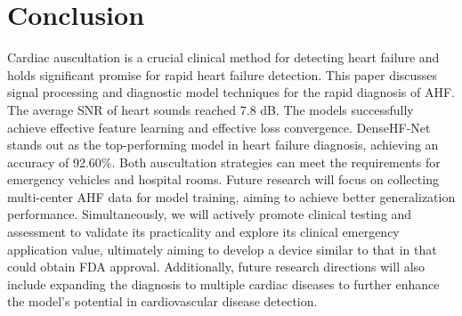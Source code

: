 \section{Conclusion}\label{Conclusion}
Cardiac auscultation is a crucial clinical method for detecting heart failure and holds significant promise for rapid heart failure detection. This paper discusses signal processing and diagnostic model techniques for the rapid diagnosis of AHF. The average SNR of heart sounds reached 7.8 dB. The models successfully achieve effective feature learning and effective loss convergence. DenseHF-Net stands out as the top-performing model in heart failure diagnosis, achieving an accuracy of 92.60\%. Both auscultation strategies can meet the requirements for emergency vehicles and hospital rooms. Future research will focus on collecting multi-center AHF data for model training, aiming to achieve better generalization performance. Simultaneously, we will actively promote clinical testing and assessment to validate its practicality and explore its clinical emergency application value, ultimately aiming to develop a device similar to that in \cite{2022Audicor} that could obtain FDA approval. Additionally, future research directions will also include expanding the diagnosis to multiple cardiac diseases to further enhance the model's potential in cardiovascular disease detection.
